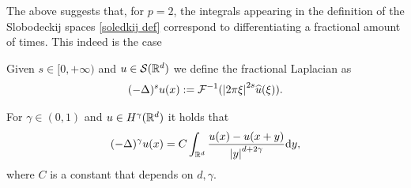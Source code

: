 \documentclass[
    a4paper,
    DIV=14,
    abstract=true,
    numbers=noenddot
]{scrartcl}
\begin{document}
The above suggests that, for $p=2$, the integrals appearing in the definition of the Slobodeckij spaces \ref{soledkij def} correspond to differentiating a fractional amount of times. This indeed is the case
\begin{definition}
    Given $s \in [0,+\infty)$ and $u \in \mathcal{S} (\mathbb{R}^d)$ we define the fractional Laplacian as
    \begin{align*}
        (-\Delta )^{s }u(x):= \mathcal{F}^{-1}({\left| 2\pi\xi \right|}^{2 s }\widehat{u}(\xi )).
    \end{align*}
\end{definition}
\begin{proposition}\label{fractional laplacian}
    For $\gamma  \in (0,1)$ and $u \in H^{\gamma }(\mathbb{R}^d)$ it holds that
    \begin{align*}
        (-\Delta )^{\gamma }u(x)=C\int_{\mathbb{R}^d}\frac{u(x)-u(x+y)}{{\left| y \right|}^{d+2\gamma}}\mathrm{d} y,
    \end{align*}
    where $C$ is a constant that depends on $d,\gamma $.
\end{proposition}
\end{document}
